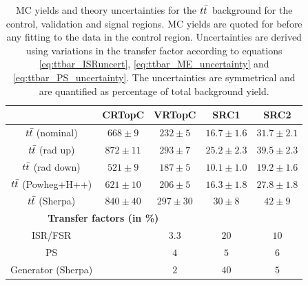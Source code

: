  \begin{table}[!h]
    \caption{MC yields and theory uncertainties for the $t\bar{t}$\ background for the control, validation and signal regions.  MC yields are quoted for before any fitting to the data in the control region. Uncertainties are derived using variations in the transfer factor according to equations \ref{eq:ttbar_ISRuncert}, \ref{eq:ttbar_ME_uncertainty} and \ref{eq:ttbar_PS_uncertainty}. The uncertainties are symmetrical and are quantified as percentage of total background yield. }
    \label{tab:ttbar_unc_SRC}
    \begin{center} %
    
        \begin{tabular}{|c|c|c|c|c|}
	\noalign{\smallskip}\noalign{\smallskip}\hline
        & CRTopC & VRTopC & SRC1 & SRC2\\
        \hline
$t\bar{t}$ (nominal)&   $668\pm 9 $&         $232\pm 5 $ &    $16.7\pm 1.6 $&         $31.7\pm 2.1 $\\
$t\bar{t}$ (rad up)&          $872\pm 11 $&         $293\pm 7 $ &            $25.2\pm 2.3 $&         $39.5\pm 2.3 $\\
$t\bar{t}$ (rad down)&        $521\pm 9 $&   $187\pm 5 $ &         $10.1\pm 1.0 $&         $19.2\pm 1.6 $\\
$t\bar{t}$ (Powheg+H++)&      $621\pm 10 $&         $206\pm 5 $&      $16.3\pm 1.8 $&         $27.8\pm 1.8 $\\
$t\bar{t}$ (Sherpa)&          $840\pm 40 $&        $297\pm 30 $&            $30\pm 8 $&     $42\pm 9 $\\        
        \hline
        \multicolumn{3}{c}{\bf Transfer factors (in \%)} \\ \hline
        ISR/FSR &  &    $3.3$&      $20$&   $10$\\
        PS &     &   $4$&   $5$&    $6$\\
        Generator (Sherpa) &    &          $2$&    $40$&   $5$\\
        \hline       
        \end{tabular}
    

\end{center}
\end{table}
